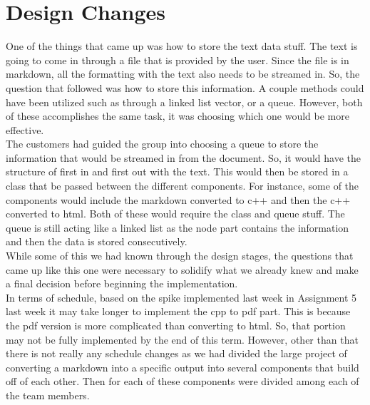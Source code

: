 \section{Design Changes}
One of the things that came up was how to store the text data stuff. The text is going to come in through a file that is provided by the user. Since the file is in markdown, all the formatting with the text also needs to be streamed in. So, the question that followed was how to store this information. A couple methods could have been utilized such as through a linked list vector, or a queue. However, both of these accomplishes the same task, it was choosing which one would be more effective.\\

The customers had guided the group into choosing a queue to store the information that would be streamed in from the document. So, it would have the structure of first in and first out with the text. This would then be stored in a class that be passed between the different components. For instance, some of the components would include the markdown converted to c++ and then the c++ converted to html. Both of these would require the class and queue stuff. The queue is still acting like a linked list as the node part contains the information and then the data is stored consecutively.\\

While some of this we had known through the design stages, the questions that came up like this one were necessary to solidify what we already knew and make a final decision before beginning the implementation.\\

In terms of schedule, based on the spike implemented last week in Assignment 5 last week it may take longer to implement the cpp to pdf part. This is because the pdf version is more complicated than converting to html. So, that portion may not be fully implemented by the end of this term. However, other than that there is not really any schedule changes as we had divided the large project of converting a markdown into a specific output into several components that build off of each other. Then for each of these components were divided among each of the team members. \\
